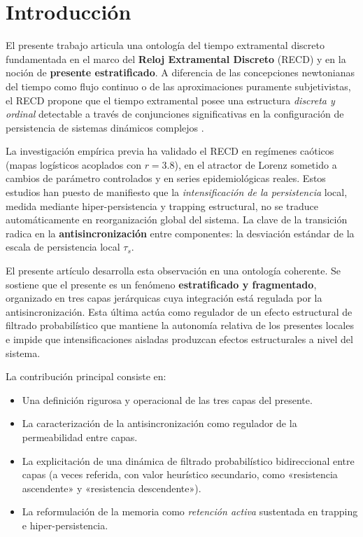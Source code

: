 \section{Introducción}

El presente trabajo articula una ontología del tiempo extramental discreto fundamentada en el marco del \textbf{Reloj Extramental Discreto} (RECD) y en la noción de \textbf{presente estratificado}. A diferencia de las concepciones newtonianas del tiempo como flujo continuo o de las aproximaciones puramente subjetivistas, el RECD propone que el tiempo extramental posee una estructura \textit{discreta y ordinal} detectable a través de conjunciones significativas en la configuración de persistencia de sistemas dinámicos complejos \citep{padilla_bayesian_accumulator_2026,padilla_sintesis_magna_2026}.

La investigación empírica previa ha validado el RECD en regímenes caóticos (mapas logísticos acoplados con $r=3.8$), en el atractor de Lorenz sometido a cambios de parámetro controlados y en series epidemiológicas reales. Estos estudios han puesto de manifiesto que la \textit{intensificación de la persistencia} local, medida mediante hiper-persistencia y trapping estructural, no se traduce automáticamente en reorganización global del sistema. La clave de la transición radica en la \textbf{antisincronización} entre componentes: la desviación estándar de la escala de persistencia local $\tau_s$.

El presente artículo desarrolla esta observación en una ontología coherente. Se sostiene que el presente es un fenómeno \textbf{estratificado y fragmentado}, organizado en tres capas jerárquicas cuya integración está regulada por la antisincronización. Esta última actúa como regulador de un efecto estructural de filtrado probabilístico que mantiene la autonomía relativa de los presentes locales e impide que intensificaciones aisladas produzcan efectos estructurales a nivel del sistema.

La contribución principal consiste en:
\begin{itemize}
    \item Una definición rigurosa y operacional de las tres capas del presente.
    \item La caracterización de la antisincronización como regulador de la permeabilidad entre capas.
    \item La explicitación de una dinámica de filtrado probabilístico bidireccional entre capas (a veces referida, con valor heurístico secundario, como «resistencia ascendente» y «resistencia descendente»).
    \item La reformulación de la memoria como \textit{retención activa} sustentada en trapping e hiper-persistencia.
\end{itemize}

